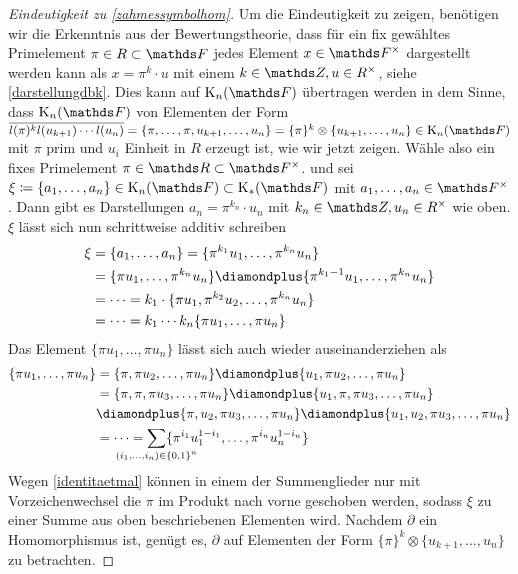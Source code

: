 \documentclass[ngerman,fontsize=11pt, paper=a4, parskip=half, titlepage=true, toc=bib]{scrartcl}
\begin{document}
\begin{proof}[Eindeutigkeit zu \ref{zahmessymbolhom}]
  Um die Eindeutigkeit zu zeigen, benötigen wir die Erkenntnis aus der
  Bewertungstheorie, dass für ein fix gewähltes Primelement $\pi\in
  R\subset \F$ jedes Element $x\in\Fx$ 
  dargestellt werden kann als $x=\pi^k\cdot u$ mit einem $k\in\Z,
  u\in R^\times$, siehe \ref{darstellungdbk}.
  Dies kann auf $\KnF$ übertragen werden in dem Sinne, dass 
  $\KnF$ von Elementen der Form 
  $\overline{l(\pi)^kl(u_{k+1})\dotsm l(u_n)}
  =\{\pi,\dotsc, \pi, u_{k+1},\dotsc,u_n\}
  =\{\pi\}^k\otimes\{u_{k+1},\dotsc,u_n\}\in\KnF$ mit $\pi$ prim und
  $u_i$ Einheit in $R$ erzeugt ist, wie wir jetzt zeigen.
  Wähle also ein fixes Primelement $\pi\in\R\subset\Fx$.
  und sei $\xi\coloneqq\{a_1,\dotsc, a_n\}\in\KnF\subset\KF$ mit
  $a_1,\dotsc,a_n\in\Fx$. Dann gibt es Darstellungen
  $a_n=\pi^{k_n}\cdot u_n$ mit $k_n\in\Z,u_n\in R^\times$ wie
  oben. $\xi$ lässt sich nun schrittweise additiv schreiben
  \begin{align*}
    \xi&=\{a_1,\dotsc,a_n\}=\{\pi^{k_1}u_1, \dotsc, \pi^{k_n}u_n\}\\
       &=\{\pi u_1, \dotsc, \pi^{k_n}u_n\}
         \p\{\pi^{k_1-1}u_1, \dotsc, \pi^{k_n}u_n\}\\
       &=\dotsb
         =k_1\cdot \{\pi u_1,\pi^{k_2}u_2, \dotsc, \pi^{k_n}u_n\}\\
       &=\dotsb 
         =k_1\dotsm k_n\{\pi u_1, \dotsc, \pi u_n\}
  \end{align*}
  Das Element $\{\pi u_1, \dotsc, \pi u_n\}$ lässt sich auch wieder
  auseinanderziehen als
  \begin{align*}
    \{\pi u_1, \dotsc, \pi u_n\} 
    &= \{\pi,\pi u_2,\dotsc,\pi u_n\}\p\{u_1,\pi u_2,\dotsc,\pi u_n\}\\
    &= \{\pi,\pi,\pi u_3,\dotsc,\pi u_n\}
      \p\{u_1,\pi,\pi u_3,\dotsc,\pi u_n\}\\
    &\p\{\pi,u_2,\pi u_3,\dotsc,\pi u_n\}
      \p\{u_1,u_2,\pi u_3,\dotsc,\pi u_n\}\\
    &=\dotsb=\sum_{\mathclap{(i_1,\dotsc,i_n)\in\{0,1\}^n}}
      \{\pi^{i_1}u_1^{1-i_1},\dotsc,\pi^{i_n}u_n^{1-i_n}\}\\
  \end{align*}
  Wegen \ref{identitaetmal} können in einem der Summenglieder nur mit
  Vorzeichenwechsel die $\pi$ im Produkt nach vorne geschoben werden,
  sodass $\xi$ zu einer Summe aus oben beschriebenen Elementen wird.
  Nachdem $\partial$ ein Homomorphismus ist, genügt es, $\partial$ auf
  Elementen der Form $\{\pi\}^k\otimes\{u_{k+1},\dotsc,u_{n}\}$ zu
  betrachten.


\end{proof}
\end{document}
